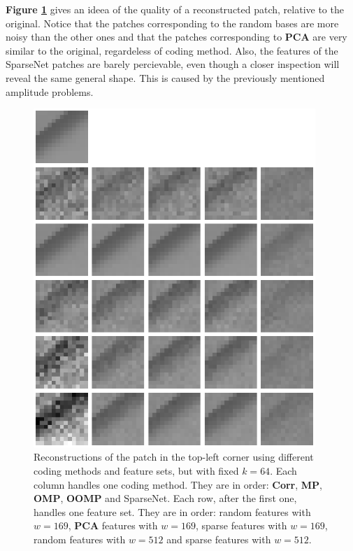 \documentclass[12pt,a4paper,oneside,english]{UPBThesis}
\begin{document}
\textbf{Figure \ref{fig:RecSparsePictures}} gives an ideea of the quality of a reconstructed patch, relative to the original. Notice that the patches corresponding to the random bases are more noisy than the other ones and that the patches corresponding to \textbf{PCA} are very similar to the original, regardeless of coding method. Also, the features of the SparseNet patches are barely percievable, even though a closer inspection will reveal the same general shape. This is caused by the previously mentioned amplitude problems.

\begin{figure}
\centering
\includegraphics[width=0.95\textwidth,height=0.8\textheight]{thesis_data/recsparse/rec_pictures.png}
\caption{Reconstructions of the patch in the top-left corner using different coding methods and feature sets, but with fixed $k=64$. Each column handles one coding method. They are in order: \textbf{Corr}, \textbf{MP}, \textbf{OMP}, \textbf{OOMP} and SparseNet. Each row, after the first one,  handles one feature set. They are in order: random features with $w=169$, \textbf{PCA} features with $w=169$, sparse features with $w=169$, random features with $w=512$ and sparse features with $w=512$.}
\label{fig:RecSparsePictures}
\end{figure}
\end{document}
